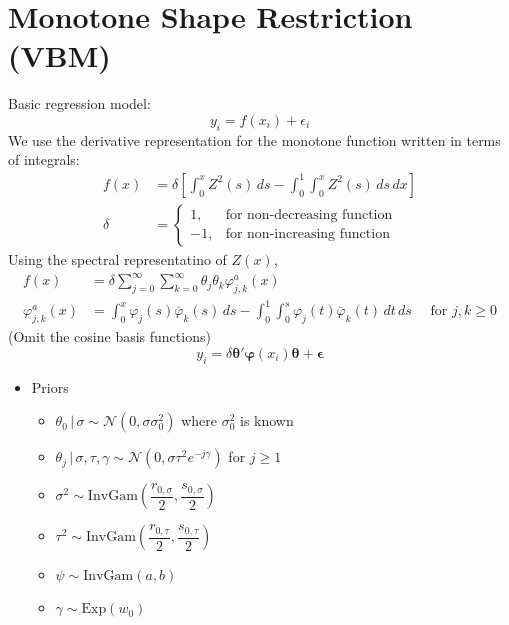 \documentclass[review]{elsarticle}
\begin{document}
\section{Monotone Shape Restriction (VBM)}
Basic regression model:
\begin{equation}
  y_{i} = f(x_{i})+\epsilon_{i}
\end{equation}
We use the derivative representation for the monotone function written in terms of integrals:
\begin{align}
  f(x)&=\delta\left[\int_{0}^{x}Z^{2}(s)\,ds-\int_{0}^{1}\int_{0}^{x}Z^{2}(s)\,ds\,dx\right]\\
  \delta &= \begin{cases}1, & \text{for non-decreasing function}\\-1, & \text{for non-increasing function} \end{cases}
\end{align}
Using the spectral representatino of $Z(x)$,
\begin{align}
  f(x) &= \delta\sum_{j=0}^{\infty}\sum_{k=0}^{\infty}\theta_{j}\theta_{k}\varphi_{j,k}^{a}(x)\\
  \varphi_{j,k}^{a}(x) &= \int_{0}^{x}\varphi_{j}(s)\overline{\varphi}_{k}(s)\,ds-\int_{0}^{1}\int_{0}^{s}\varphi_{j}(t)\overline{\varphi}_{k}(t)\,dt\,ds\quad \text{ for }j,k\geq 0
\end{align}
(Omit the cosine basis functions)
\begin{equation}
  y_{i} = \delta\bm{\theta}'\bm{\varphi}(x_{i})\bm{\theta}+\bm{\epsilon}
\end{equation}
\begin{itemize}
  \item Priors
  \begin{itemize}
    \item $\theta_{0}\,|\,\sigma \sim \mathcal{N}\left(0,\sigma\sigma_{0}^{2}\right)$ where $\sigma_{0}^{2}$ is known
    \item $\theta_{j}\,|\,\sigma,\tau,\gamma\sim\mathcal{N}\left(0,\sigma\tau^{2}e^{-j\gamma}\right)$ for $j\geq 1$
    \item $\sigma^{2}\sim\mathrm{InvGam}\left(\dfrac{r_{0,\sigma}}{2},\dfrac{s_{0,\sigma}}{2}\right)$
    \item $\tau^{2}\sim\mathrm{InvGam}\left(\dfrac{r_{0,\tau}}{2},\dfrac{s_{0,\tau}}{2}\right)$
    \item $\psi\sim\mathrm{InvGam}(a,b)$
    \item $\gamma\sim\mathrm{Exp}(w_{0}) $
  \end{itemize}
\end{itemize}
\end{document}
